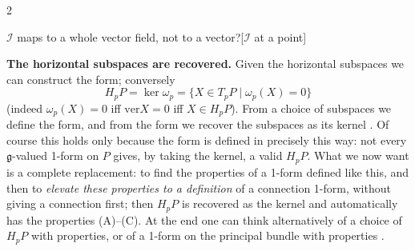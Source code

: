 \begin{paracol}{2}
\begin{answer}{$\mathcal I$ maps to a whole vector field, not to a vector?}[$\mathcal I$ at a point]
\end{answer}
\textbf{The horizontal subspaces are recovered.} Given the horizontal subspaces we can construct the form; conversely  
\[
  H_pP=\ker\omega_p=\{X\in T_pP\mid\omega_p(X)=0\}
\]
(indeed $\omega_p(X)=0$ iff $\mathrm{ver}X=0$ iff $X\in H_pP$). From a choice of subspaces we define the form, and from the form we recover the subspaces as its kernel   . Of course this holds only because the form is defined in precisely this way: not every $\mathfrak g$-valued 1-form on $P$ gives, by taking the kernel, a valid $H_pP$. What we now want is a complete replacement: to find the properties of a 1-form defined like this, and then to \emph{elevate these properties to a definition} of a connection 1-form, without giving a connection first; then $H_pP$ is recovered as the kernel and automatically has the properties (A)--(C). At the end one can think alternatively of a choice of $H_pP$ with properties, or of a 1-form on the principal bundle with properties   .


\end{paracol}
